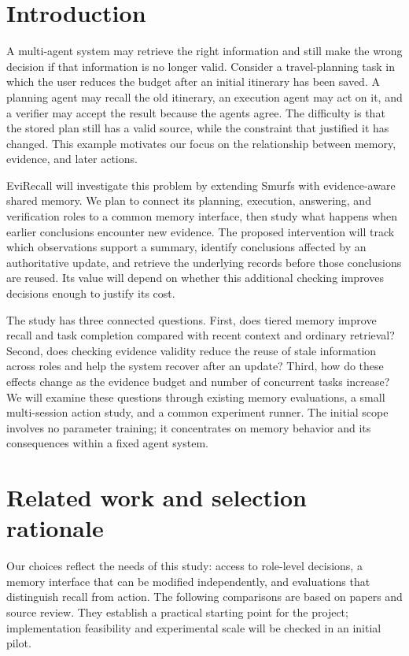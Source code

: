\documentclass[a4paper,11pt]{article}
\begin{document}
\section{Introduction}
A multi-agent system may retrieve the right information and still make the wrong decision if that information is no longer valid. Consider a travel-planning task in which the user reduces the budget after an initial itinerary has been saved. A planning agent may recall the old itinerary, an execution agent may act on it, and a verifier may accept the result because the agents agree. The difficulty is that the stored plan still has a valid source, while the constraint that justified it has changed. This example motivates our focus on the relationship between memory, evidence, and later actions.\par

EviRecall will investigate this problem by extending Smurfs with evidence-aware shared memory. We plan to connect its planning, execution, answering, and verification roles to a common memory interface, then study what happens when earlier conclusions encounter new evidence. The proposed intervention will track which observations support a summary, identify conclusions affected by an authoritative update, and retrieve the underlying records before those conclusions are reused. Its value will depend on whether this additional checking improves decisions enough to justify its cost.\par

The study has three connected questions. First, does tiered memory improve recall and task completion compared with recent context and ordinary retrieval? Second, does checking evidence validity reduce the reuse of stale information across roles and help the system recover after an update? Third, how do these effects change as the evidence budget and number of concurrent tasks increase? We will examine these questions through existing memory evaluations, a small multi-session action study, and a common experiment runner. The initial scope involves no parameter training; it concentrates on memory behavior and its consequences within a fixed agent system.\par

\clearpage
\section{Related work and selection rationale}
Our choices reflect the needs of this study: access to role-level decisions, a memory interface that can be modified independently, and evaluations that distinguish recall from action. The following comparisons are based on papers and source review. They establish a practical starting point for the project; implementation feasibility and experimental scale will be checked in an initial pilot.\par
\end{document}

